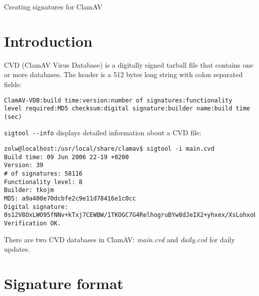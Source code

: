 \documentclass[a4paper,titlepage,12pt]{article}
\date{}
\begin{document}
    \begin{center}
	\huge Creating signatures for ClamAV\\
	\vspace{2cm}
    \end{center}

    \noindent
    \section{Introduction}
    CVD (ClamAV Virus Database) is a digitally signed tarball file that
    contains one or more databases. The header is a 512 bytes long string
    with colon separated fields:
    \begin{verbatim}
ClamAV-VDB:build time:version:number of signatures:functionality
level required:MD5 checksum:digital signature:builder name:build time (sec)
    \end{verbatim}
    \verb+sigtool --info+ displays detailed information about a CVD file:
    \begin{verbatim}
zolw@localhost:/usr/local/share/clamav$ sigtool -i main.cvd
Build time: 09 Jun 2006 22-19 +0200
Version: 39
# of signatures: 58116
Functionality level: 8
Builder: tkojm
MD5: a9a400e70dcbfe2c9e11d78416e1c0cc
Digital signature: 0s12V8OxLWO95fNNv+kTxj7CEWBW/1TKOGC7G4RelhogruBYw8dJeIX2+yhxex/XsLohxoEuXxC2CaFXiiTbrbvpK2USIxkpn53n6LYVV6jKgkP5sa08MdJE7cl29H1slfCrdaevBUZ1Z/UefkRnV6p3iQVpDPsBwqFRbrem33b
Verification OK.
    \end{verbatim}
    There are two CVD databases in ClamAV: \emph{main.cvd} and \emph{daily.cvd}
    for daily updates.

    \section{Signature format}
\end{document}
